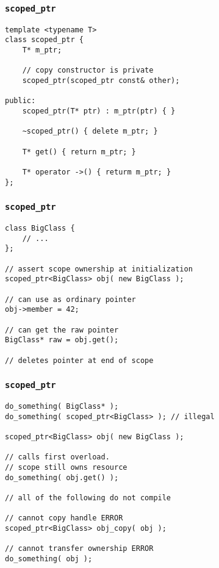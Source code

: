 \begin{frame}[fragile]
    \frametitle{\texttt{scoped\_ptr}}
    \begin{lstlisting}[title=Implementation]
template <typename T>
class scoped_ptr {
    T* m_ptr;

    // copy constructor is private
    scoped_ptr(scoped_ptr const& other);

public:
    scoped_ptr(T* ptr) : m_ptr(ptr) { }

    ~scoped_ptr() { delete m_ptr; }

    T* get() { return m_ptr; }

    T* operator ->() { returm m_ptr; }
};
    \end{lstlisting}
\end{frame}

\begin{frame}[fragile]
    \frametitle{\texttt{scoped\_ptr}}
    \begin{lstlisting}[title=Usage]
class BigClass {
    // ...
};

// assert scope ownership at initialization
scoped_ptr<BigClass> obj( new BigClass );

// can use as ordinary pointer
obj->member = 42;

// can get the raw pointer
BigClass* raw = obj.get();

// deletes pointer at end of scope
    \end{lstlisting}
\end{frame}

\begin{frame}[fragile]
    \frametitle{\texttt{scoped\_ptr}}
    \begin{lstlisting}[title=Compile time enforcement]
do_something( BigClass* );
do_something( scoped_ptr<BigClass> ); // illegal

scoped_ptr<BigClass> obj( new BigClass );

// calls first overload.
// scope still owns resource
do_something( obj.get() );

// all of the following do not compile

// cannot copy handle ERROR
scoped_ptr<BigClass> obj_copy( obj );

// cannot transfer ownership ERROR
do_something( obj );
    \end{lstlisting}
\end{frame}

